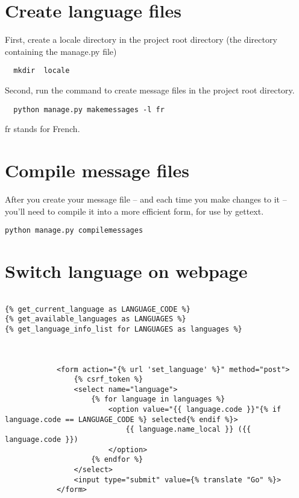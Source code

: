 \section{Create language files}

First, create a locale directory in the project root directory (the directory containing the manage.py file)
\begin{lstlisting}
  mkdir  locale
\end{lstlisting}


Second, run the command to create message files in the project root directory.
\begin{lstlisting}
  python manage.py makemessages -l fr
\end{lstlisting}

fr stands for French.


\section{Compile message files}

After you create your message file – and each time you make changes to it – you’ll need to compile it into a more efficient form, for use by gettext.




\begin{lstlisting}
python manage.py compilemessages
\end{lstlisting}




\section{Switch language on webpage}

\begin{lstlisting}

{% get_current_language as LANGUAGE_CODE %}
{% get_available_languages as LANGUAGES %}
{% get_language_info_list for LANGUAGES as languages %}

    
  
            <form action="{% url 'set_language' %}" method="post">
                {% csrf_token %}
                <select name="language">
                    {% for language in languages %}
                        <option value="{{ language.code }}"{% if language.code == LANGUAGE_CODE %} selected{% endif %}>
                            {{ language.name_local }} ({{ language.code }})
                        </option>
                    {% endfor %}
                </select>
                <input type="submit" value={% translate "Go" %}>
            </form>  
\end{lstlisting}



